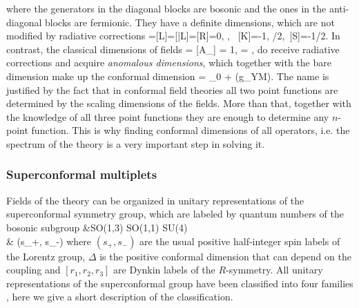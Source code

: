 \)
\eeq
where the generators in the diagonal blocks are bosonic and the ones in the anti-diagonal blocks are fermionic.
They have a definite dimensions, which are not modified by radiative corrections
\beq
	[D]=[L]=[\bar L]=[R]=0\;, \;, \ [K]=-1\;, /2\;,\  [S]=-1/2\;.
\eeq
In contrast, the classical dimensions of fields
\beq
	[\Phi^I] = [A_\mu] = 1\;, \quad [\psi_a] = ,
\eeq
do receive radiative corrections and acquire \emph{anomalous dimensions}, which together with the bare dimension make up the conformal dimension
\beq
	\Delta = \Delta_0 + \gamma(g_{YM}).
\eeq
The name is justified by the fact that in conformal field theories all two point functions are determined by the scaling dimensions of the fields. 
More than that, together with the knowledge of all three point functions they are enough to determine any $n$-point function. 
This is why finding conformal dimensions of all operators, i.e. the spectrum of the theory is a very important step in solving it.

\subsubsection{Superconformal multiplets}

Fields of the theory can be organized in unitary representations of the superconformal symmetry group, which are labeled by quantum numbers of the bosonic subgroup
\beqa
	&SO(1,3) \times SO(1,1) \times SU(4) \nonumber \\
	&\quad \; (s_+, s_-) \quad \quad \Delta \quad \quad  [r_1, r_2, r_3]
\eeqa 
where $(s_+, s_-)$ are the usual positive half-integer spin labels of the Lorentz group, $\Delta$ is the positive conformal dimension that can depend on the coupling and $[r_1, r_2, r_3]$ are Dynkin labels of the $R$-symmetry.
All unitary representations of the superconformal group have been classified into four families \cite{Dobrev:1985ab,Dobrev:1985cd}, here we give a short description of the classification.
  
